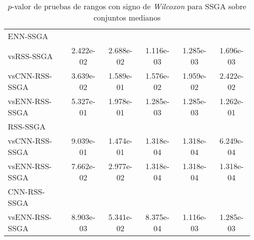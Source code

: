 \begin{table}[h!]
\begin{adjustbox}{max width =\textwidth}
\begin{tabular}{l c c c c c}
\hline

ENN-SSGA\\
vsRSS-SSGA & 2.422e-02 & 2.688e-02 & 1.116e-03 & 1.285e-03 & 1.696e-03 \\ 
vsCNN-RSS-SSGA & 3.639e-02 & 1.589e-01 & 1.576e-02 & 1.959e-02 & 2.422e-02 \\
vsENN-RSS-SSGA & 5.327e-01 & 1.978e-01 & 1.285e-03 & 1.285e-03 & 1.262e-01 \\

\hline

RSS-SSGA\\
vsCNN-RSS-SSGA & 9.039e-01 & 1.474e-01 & 1.318e-04 & 1.318e-04 & 6.249e-04 \\ 
vsENN-RSS-SSGA  & 7.662e-02 & 2.977e-02 & 1.318e-04 & 1.318e-04 & 1.318e-04 \\

\hline

CNN-RSS-SSGA\\
vsENN-RSS-SSGA & 8.903e-03 & 5.341e-02 & 8.375e-04 & 1.116e-03 & 1.285e-03 \\


\hline

\end{tabular}
\end{adjustbox}
\caption[Pruebas de \emph{Wilcoxon} entre SSGA y variaciones para conjuntos medianos]{$p$-valor de pruebas de rangos con signo de \emph{Wilcoxon} para SSGA sobre conjuntos medianos}
\label{wilcox-SSGA-med}
\end{table}


